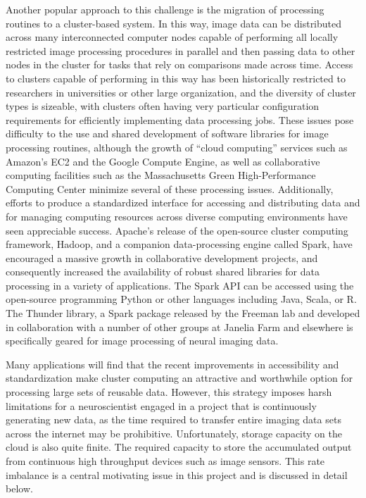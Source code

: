 Another popular approach to this challenge is the migration of processing routines to a cluster-based system.
In this way, image data can be distributed across many interconnected computer nodes capable of performing all locally restricted image processing procedures in parallel and then passing data to other nodes in the cluster for tasks that rely on comparisons made across time.
Access to clusters capable of performing in this way has been historically restricted to researchers in universities or other large organization, and the diversity of cluster types is sizeable, with clusters often having very particular configuration requirements for efficiently implementing data processing jobs.
These issues pose difficulty to the use and shared development of software libraries for image processing routines, although the growth of ``cloud computing'' services such as Amazon's EC2 and the Google Compute Engine, as well as collaborative computing facilities such as the Massachusetts Green High-Performance Computing Center minimize several of these processing issues.
Additionally, efforts to produce a standardized interface for accessing and distributing data and for managing computing resources across diverse computing environments have seen appreciable success.
Apache's release of the open-source cluster computing framework, Hadoop, and a companion data-processing engine called Spark, have encouraged a massive growth in collaborative development projects, and consequently increased the availability of robust shared libraries for data processing in a variety of applications.
The Spark API can be accessed using the open-source programming Python or other languages including Java, Scala, or R.
The Thunder library, a Spark package released by the Freeman lab and developed in collaboration with a number of other groups at Janelia Farm and elsewhere is specifically geared for image processing of neural imaging data.

Many applications will find that the recent improvements in accessibility and standardization make cluster computing an attractive and worthwhile option for processing large sets of reusable data.
However, this strategy imposes harsh limitations for a neuroscientist engaged in a project that is continuously generating new data, as the time required to transfer entire imaging data sets across the internet may be prohibitive.
Unfortunately, storage capacity on the cloud is also quite finite.
The required capacity to store the accumulated output from continuous high throughput devices such as image sensors.
This rate imbalance is a central motivating issue in this project and is discussed in detail below.

